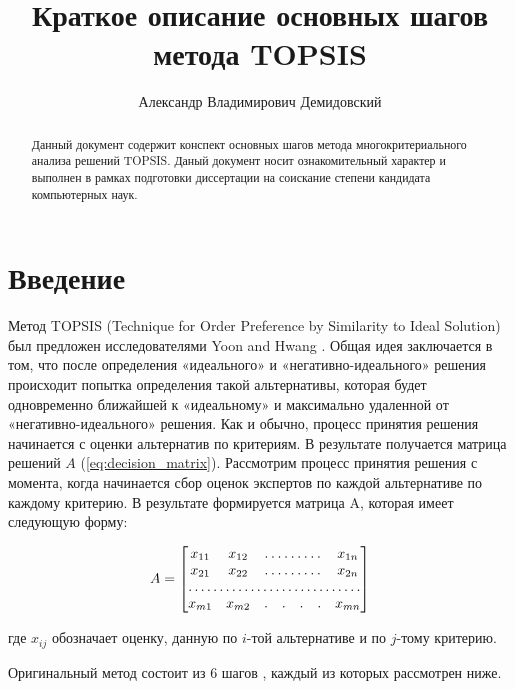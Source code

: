 \documentclass{article}
\title{Краткое описание основных шагов метода TOPSIS}
\author{Александр Владимирович Демидовский}
\begin{document}
\maketitle

\begin{abstract}
Данный документ содержит конспект основных шагов метода многокритериального анализа решений TOPSIS. Даный документ носит ознакомительный характер и выполнен в рамках подготовки диссертации на соискание степени кандидата компьютерных наук.
\end{abstract}

\section{Введение}

    Метод TOPSIS (Technique for Order Preference by Similarity to Ideal Solution) был предложен
    исследователями Yoon and Hwang \cite{scm:electre:4:hwang1981topsis}. Общая идея заключается
    в том, что после определения «идеального» и «негативно-идеального» решения происходит
    попытка определения такой альтернативы, которая будет одновременно ближайшей к «идеальному»
    и максимально удаленной от «негативно-идеального» решения. Как и обычно, процесс принятия
    решения начинается с оценки альтернатив по критериям. В результате получается матрица
    решений \(A\) (\ref{eq:decision_matrix}). Рассмотрим процесс принятия решения с момента, когда
    начинается сбор оценок экспертов по каждой альтернативе по каждому критерию. В результате
    формируется матрица A, которая имеет следующую форму:

    \begin{equation}
    \label{eq:decision_matrix}
        A = \begin{bmatrix}
            x_{11}&  x_{12}& \hdotsfor{4} & x_{1n}\\
            x_{21}&  x_{22}& \hdotsfor{4} & x_{2n}\\
        \hdotsfor{7}\\
        x_{m1}&  x_{m2}& . & . & . & . & x_{mn}\\
        \end{bmatrix}
    \end{equation}

    где \(x_{ij}\) обозначает оценку, данную по \(i\)-той альтернативе и по \(j\)-тому критерию.

    Оригинальный метод состоит из 6 шагов
    \cite{scm:electre:1:hwang1981methods}, каждый из которых рассмотрен ниже.
\end{document}
